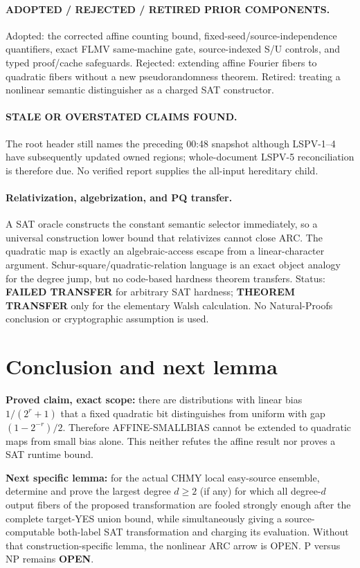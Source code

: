 \documentclass[11pt]{article}
\begin{document}
\paragraph{ADOPTED / REJECTED / RETIRED PRIOR COMPONENTS.}
Adopted: the corrected affine counting bound, fixed-seed/source-independence
quantifiers, exact FLMV same-machine gate, source-indexed S/U controls, and
typed proof/cache safeguards.  Rejected: extending affine Fourier fibers to
quadratic fibers without a new pseudorandomness theorem.  Retired: treating a
nonlinear semantic distinguisher as a charged SAT constructor.

\paragraph{STALE OR OVERSTATED CLAIMS FOUND.}
The root header still names the preceding 00:48 snapshot although LSPV-1--4 have
subsequently updated owned regions; whole-document LSPV-5 reconciliation is
therefore due.  No verified report supplies the all-input hereditary child.

\paragraph{Relativization, algebrization, and PQ transfer.}
A SAT oracle constructs the constant semantic selector immediately, so a
universal construction lower bound that relativizes cannot close ARC.  The
quadratic map is exactly an algebraic-access escape from a linear-character
argument.  Schur-square/quadratic-relation language is an exact object analogy
for the degree jump, but no code-based hardness theorem transfers.  Status:
\textbf{FAILED TRANSFER} for arbitrary SAT hardness; \textbf{THEOREM TRANSFER}
only for the elementary Walsh calculation.  No Natural-Proofs conclusion or
cryptographic assumption is used.

\section{Conclusion and next lemma}
\textbf{Proved claim, exact scope:} there are distributions with linear bias
$1/(2^r+1)$ that a fixed quadratic bit distinguishes from uniform with gap
$(1-2^{-r})/2$.  Therefore AFFINE-SMALLBIAS cannot be extended to quadratic maps
from small bias alone.  This neither refutes the affine result nor proves a SAT
runtime bound.

\textbf{Next specific lemma:} for the actual CHMY local easy-source ensemble,
determine and prove the largest degree $d\ge2$ (if any) for which all degree-$d$
output fibers of the proposed transformation are fooled strongly enough after
the complete target-YES union bound, while simultaneously giving a source-
computable both-label SAT transformation and charging its evaluation.  Without
that construction-specific lemma, the nonlinear ARC arrow is OPEN.  P versus NP
remains \textbf{OPEN}.
\end{document}
